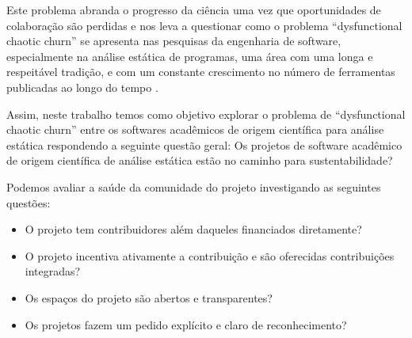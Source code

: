 Este problema abranda o progresso da ciência uma vez que oportunidades de
colaboração são perdidas \cite{stewart2010cyberinfrastructure} e nos leva a
questionar como o problema ``dysfunctional chaotic churn'' se apresenta nas
pesquisas da engenharia de software, especialmente na análise estática de
programas, uma área com uma longa e respeitável tradição, e com um constante
crescimento no número de ferramentas publicadas ao longo do tempo \cite{Li2010,
ilyas2016static}.

Assim, neste trabalho temos como objetivo explorar o problema de
``dysfunctional chaotic churn'' entre os softwares acadêmicos de origem
científica para análise estática respondendo a seguinte questão geral:
Os projetos de software acadêmico de origem científica de análise estática
estão no caminho para sustentabilidade?

Podemos avaliar a saúde da comunidade
do projeto investigando as seguintes questões:

\begin{itemize}
  \item O projeto tem contribuidores além daqueles financiados diretamente?
  \item O projeto incentiva ativamente a contribuição e são oferecidas contribuições integradas?
  \item Os espaços do projeto são abertos e transparentes?
  \item Os projetos fazem um pedido explícito e claro de reconhecimento?
\end{itemize}


